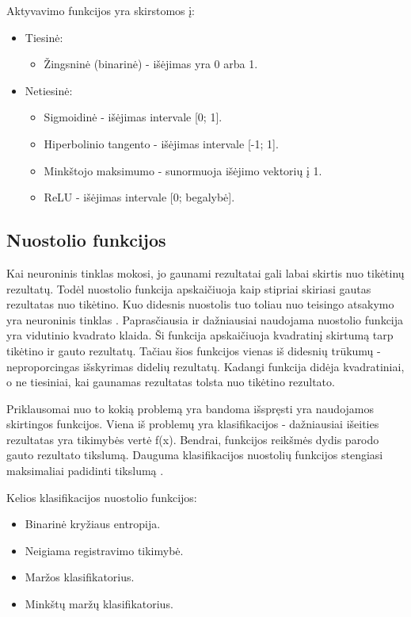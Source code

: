 \documentclass{VUMIFPSkursinis}
\begin{document}
Aktyvavimo funkcijos yra skirstomos į:
\begin{itemize}
\item Tiesinė: 
\begin{itemize}
\item Žingsninė (binarinė) - išėjimas yra 0 arba 1.
\end{itemize}
\item Netiesinė: 
\begin{itemize}
\item Sigmoidinė - išėjimas intervale [0; 1].
\item Hiperbolinio tangento - išėjimas intervale [-1; 1].
\item Minkštojo maksimumo - sunormuoja išėjimo vektorių į 1.
\item ReLU - išėjimas intervale [0; begalybė].
\end{itemize}
\end{itemize}


\subsection{Nuostolio funkcijos}
Kai neuroninis tinklas mokosi, jo gaunami rezultatai gali labai skirtis nuo tikėtinų rezultatų. Todėl nuostolio funkcija apskaičiuoja kaip stipriai
skiriasi gautas rezultatas nuo tikėtino. Kuo didesnis nuostolis tuo toliau nuo teisingo atsakymo yra neuroninis tinklas \cite{Cameron-loss-fun}.
Paprasčiausia ir dažniausiai naudojama nuostolio funkcija yra vidutinio kvadrato klaida. Ši funkcija apskaičiuoja kvadratinį skirtumą tarp tikėtino 
ir gauto rezultatų. Tačiau šios funkcijos vienas iš didesnių trūkumų - neproporcingas išskyrimas didelių rezultatų. Kadangi funkcija didėja kvadratiniai,
o ne tiesiniai, kai gaunamas rezultatas tolsta nuo tikėtino rezultato.

Priklausomai nuo to kokią problemą yra bandoma išspręsti yra naudojamos skirtingos funkcijos. Viena iš problemų yra klasifikacijos - dažniausiai išeities
rezultatas yra tikimybės vertė f(x). Bendrai, funkcijos reikšmės dydis parodo gauto rezultato tikslumą. Dauguma klasifikacijos nuostolių funkcijos stengiasi
maksimaliai padidinti tikslumą \cite{clas-loss-2017}. 


Kelios klasifikacijos nuostolio funkcijos:
\begin{itemize}
\item Binarinė kryžiaus entropija.
\item Neigiama registravimo tikimybė.
\item Maržos klasifikatorius.
\item Minkštų maržų klasifikatorius.
\end{itemize}
\end{document}
